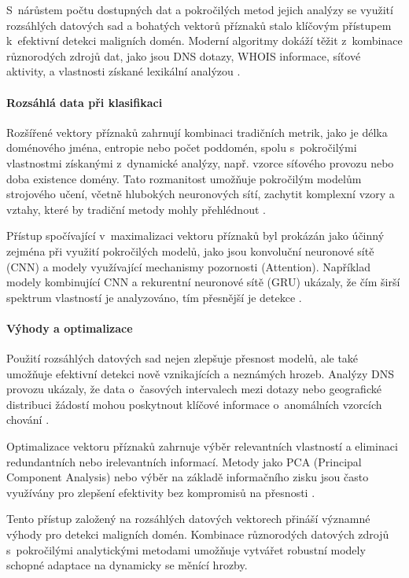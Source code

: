 S~nárůstem počtu dostupných dat a pokročilých metod jejich analýzy se využití rozsáhlých datových sad a bohatých vektorů příznaků stalo klíčovým přístupem k~efektivní detekci maligních domén. Moderní algoritmy dokáží těžit z~kombinace různorodých zdrojů dat, jako jsou DNS dotazy, WHOIS informace, síťové aktivity, a vlastnosti získané lexikální analýzou \cite{bilge2011exposure, ma2011learning}.

\paragraph{Rozsáhlá data při klasifikaci}
Rozšířené vektory příznaků zahrnují kombinaci tradičních metrik, jako je délka doménového jména, entropie nebo počet poddomén, spolu s~pokročilými vlastnostmi získanými z~dynamické analýzy, např. vzorce síťového provozu nebo doba existence domény. Tato rozmanitost umožňuje pokročilým modelům strojového učení, včetně hlubokých neuronových sítí, zachytit komplexní vzory a vztahy, které by tradiční metody mohly přehlédnout \cite{cnn_gru_attention, bilge2011exposure}.

Přístup spočívající v~maximalizaci vektoru příznaků byl prokázán jako účinný zejména při využití pokročilých modelů, jako jsou konvoluční neuronové sítě (CNN) a modely využívající mechanismy pozornosti (Attention). Například modely kombinující CNN a rekurentní neuronové sítě (GRU) ukázaly, že čím širší spektrum vlastností je analyzováno, tím přesnější je detekce \cite{cnn_gru_attention}.

\paragraph{Výhody a optimalizace}
Použití rozsáhlých datových sad nejen zlepšuje přesnost modelů, ale také umožňuje efektivní detekci nově vznikajících a neznámých hrozeb. Analýzy DNS provozu ukázaly, že data o~časových intervalech mezi dotazy nebo geografické distribuci žádostí mohou poskytnout klíčové informace o~anomálních vzorcích chování \cite{dns_query_analysis_ml}.

Optimalizace vektoru příznaků zahrnuje výběr relevantních vlastností a eliminaci redundantních nebo irelevantních informací. Metody jako PCA (Principal Component Analysis) nebo výběr na základě informačního zisku jsou často využívány pro zlepšení efektivity bez kompromisů na přesnosti \cite{ma2011learning, bilge2011exposure}.

Tento přístup založený na rozsáhlých datových vektorech přináší významné výhody pro detekci maligních domén. Kombinace různorodých datových zdrojů s~pokročilými analytickými metodami umožňuje vytvářet robustní modely schopné adaptace na dynamicky se měnící hrozby.


